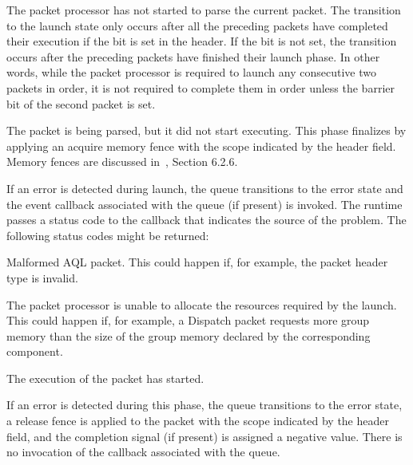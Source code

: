 \documentclass[final]{book}
\begin{document}
\begin{description}[itemsep=2pt,leftmargin=0cm, labelindent=0cm]
\item[In queue] The packet processor has not started to parse the current
  packet.  The transition to the launch state only occurs after all the
  preceding packets have completed their execution if the
   bit is set in the header. If the bit is
  not set, the transition occurs after the preceding packets have finished their
  launch phase. In other words, while the packet processor is required to launch
  any consecutive two packets in order, it is not required to complete them in
  order unless the barrier bit of the second packet is set.

\item[Launch] The packet is being parsed, but it did not start executing. This
  phase finalizes by applying an acquire memory fence with the scope indicated
  by the  header field.  Memory
  fences are discussed in~\cite{prm}, Section 6.2.6.

  If an error is detected during launch, the queue transitions to the error
  state and the event callback associated with the queue (if present) is
  invoked. The runtime passes a status code to the callback that indicates the
  source of the problem.  The following status codes might be returned:
  \begin{description}[itemsep=1.5pt,labelindent=.5cm]
  \item[\hsaref{HSA_STATUS_ERROR_INVALID_PACKET_FORMAT}] Malformed AQL
    packet. This could happen if, for example, the packet header type is invalid.
  \item[\hsaref{HSA_STATUS_ERROR_OUT_OF_RESOURCES}] The packet processor is
    unable to allocate the resources required by the launch. This could happen
    if, for example, a Dispatch packet requests more group memory than the size
    of the group memory declared by the corresponding component.
  \end{description}
\item[Active] The execution of the packet has started.

  If an error is detected during this phase, the queue transitions to the error
  state, a release fence is applied to the packet with the scope indicated by
  the  header field, and the
  completion signal (if present) is assigned a negative value. There is no
  invocation of the callback associated with the queue.


\end{description}
\end{document}
